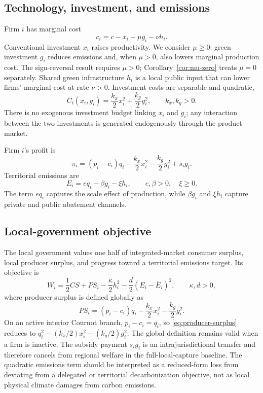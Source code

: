 \subsection{Technology, investment, and emissions}

Firm $i$ has marginal cost
\begin{equation}
c_i=c-x_i-\mu g_i-\nu h_i.
\label{eq:mc}
\end{equation}
Conventional investment $x_i$ raises productivity. We consider $\mu\geq0$: green investment $g_i$ reduces emissions and, when $\mu>0$, also lowers marginal production cost. The sign-reversal result requires $\mu>0$; Corollary~\ref{cor:mu-zero} treats $\mu=0$ separately. Shared green infrastructure $h_i$ is a local public input that can lower firms' marginal cost at rate $\nu>0$. Investment costs are separable and quadratic,
\begin{equation}
C_i(x_i,g_i)
=\frac{k_x}{2}x_i^2+\frac{k_g}{2}g_i^2,
\qquad k_x,k_g>0.
\label{eq:investment-cost}
\end{equation}
There is no exogenous investment budget linking $x_i$ and $g_i$; any interaction between the two investments is generated endogenously through the product market.

Firm $i$'s profit is
\begin{equation}
\pi_i
=(p_i-c_i)q_i
-\frac{k_x}{2}x_i^2
-\frac{k_g}{2}g_i^2
+s_i g_i.
\label{eq:profit}
\end{equation}
Territorial emissions are
\begin{equation}
E_i=e q_i-\beta g_i-\xi h_i,
\qquad e,\beta>0,\quad \xi\geq0.
\label{eq:emissions}
\end{equation}
The term $e q_i$ captures the scale effect of production, while $\beta g_i$ and $\xi h_i$ capture private and public abatement channels.

\subsection{Local-government objective}

The local government values one half of integrated-market consumer surplus, local producer surplus, and progress toward a territorial emissions target. Its objective is
\begin{equation}
W_i
=\frac12CS+PS_i-\frac{\kappa}{2}h_i^2
-\frac d2(E_i-\bar E_i)^2,
\qquad \kappa,d>0,
\label{eq:government-welfare}
\end{equation}
where producer surplus is defined globally as
\begin{equation}
PS_i=(p_i-c_i)q_i-\frac{k_x}{2}x_i^2-\frac{k_g}{2}g_i^2.
\label{eq:producer-surplus}
\end{equation}
On an active interior Cournot branch, $p_i-c_i=q_i$, so \eqref{eq:producer-surplus} reduces to $q_i^2-(k_x/2)x_i^2-(k_g/2)g_i^2$. The global definition remains valid when a firm is inactive. The subsidy payment $s_i g_i$ is an intrajurisdictional transfer and therefore cancels from regional welfare in the full-local-capture baseline. The quadratic emissions term should be interpreted as a reduced-form loss from deviating from a delegated or territorial decarbonization objective, not as local physical climate damages from carbon emissions.

